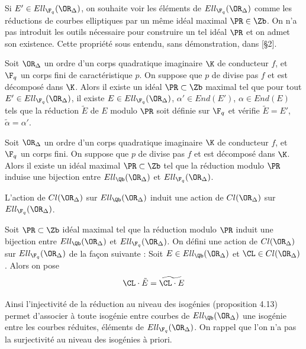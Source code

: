 Si $E'\in Ell_{\F_{q}}(\OR_{\Delta})$, on souhaite voir les éléments de $Ell_{\F_{q}}(\OR_{\Delta})$ comme les réductions de courbes elliptiques par un même idéal maximal $\PR\in\Zb$. On n'a pas introduit les outils nécessaire pour construire un tel idéal $\PR$ et on admet son existence. Cette propriété sous entendu, sans démonstration, dans \cite{BrokerCharlesLauter}[\S2].

\begin{Prop}
	Soit $\OR_{\Delta}$ un ordre d'un corps quadratique imaginaire $\K$ de conducteur $f$, et $\F_{q}$ un corps fini de caractéristique $p$. On suppose que $p$ de divise pas $f$ et est décomposé dans $\K$. Alors il existe un idéal $\PR\subset\Zb$ maximal tel que pour tout $E'\in Ell_{\F_{q}}(\OR_{\Delta})$, il existe $E\in Ell_{\F_{q}}(\OR_{\Delta})$, $\alpha'\in End(E')$, $\alpha\in End(E)$ tels que la réduction $\tilde{E}$ de $E$ modulo $\PR$ soit définie sur $\F_{q}$ et vérifie $\tilde{E} = E'$, $\tilde{\alpha} = \alpha'$.
\end{Prop}

\begin{Coro}
	Soit $\OR_{\Delta}$ un ordre d'un corps quadratique imaginaire $\K$ de conducteur $f$, et $\F_{q}$ un corps fini. On suppose que $p$ de divise pas $f$ et est décomposé dans $\K$. Alors il existe un idéal maximal $\PR\subset\Zb$ tel que la réduction modulo $\PR$ induise une bijection entre $Ell_{\Qb}(\OR_{\Delta})$ et $Ell_{\F_{q}}(\OR_{\Delta})$. 
\end{Coro}

L'action de $Cl(\OR_{\Delta})$ sur $Ell_{\Qb}(\OR_{\Delta})$ induit une action de $Cl(\OR_{\Delta})$ sur $Ell_{\F_{q}}(\OR_{\Delta})$.

\begin{Def}
	Soit $\PR\subset\Zb$ idéal maximal tel que la réduction modulo $\PR$ induit une bijection entre $Ell_{\Qb}(\OR_{\Delta})$ et $Ell_{\F_{q}}(\OR_{\Delta})$. On défini une action de $Cl(\OR_{\Delta})$ sur $Ell_{\F_{q}}(\OR_{\Delta})$ de la façon suivante : Soit $E\in Ell_{\Qb}(\OR_{\Delta})$ et $\CL\in Cl(\OR_{\Delta})$. Alors on pose
	\begin{equation*}
		\CL\cdot\tilde{E} = \widetilde{\CL\cdot E}
	\end{equation*}
\end{Def}

\begin{Rem}
	Ainsi l'injectivité de la réduction au niveau des isogénies (proposition 4.13) permet d'associer à toute isogénie entre courbes de $Ell_{\Qb}(\OR_{\Delta})$ une isogénie entre les courbes réduites, éléments de $Ell_{\F_{q}}(\OR_{\Delta})$. On rappel que l'on n'a pas la surjectivité au niveau des isogénies à priori.
\end{Rem}

